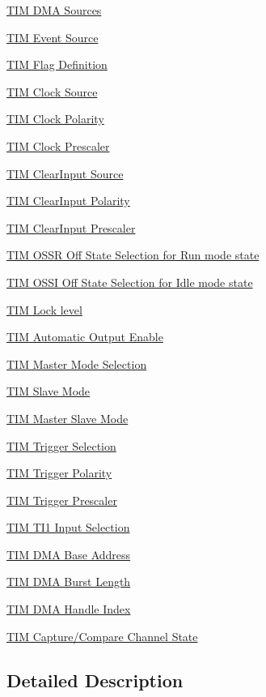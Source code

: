 \begin{DoxyCompactItemize}
\item 
\hyperlink{group___t_i_m___d_m_a__sources}{T\-I\-M D\-M\-A Sources}
\item 
\hyperlink{group___t_i_m___event___source}{T\-I\-M Event Source}
\item 
\hyperlink{group___t_i_m___flag__definition}{T\-I\-M Flag Definition}
\item 
\hyperlink{group___t_i_m___clock___source}{T\-I\-M Clock Source}
\item 
\hyperlink{group___t_i_m___clock___polarity}{T\-I\-M Clock Polarity}
\item 
\hyperlink{group___t_i_m___clock___prescaler}{T\-I\-M Clock Prescaler}
\item 
\hyperlink{group___t_i_m___clear_input___source}{T\-I\-M Clear\-Input Source}
\item 
\hyperlink{group___t_i_m___clear_input___polarity}{T\-I\-M Clear\-Input Polarity}
\item 
\hyperlink{group___t_i_m___clear_input___prescaler}{T\-I\-M Clear\-Input Prescaler}
\item 
\hyperlink{group___t_i_m___o_s_s_r___off___state___selection__for___run__mode__state}{T\-I\-M O\-S\-S\-R Off State Selection for Run mode state}
\item 
\hyperlink{group___t_i_m___o_s_s_i___off___state___selection__for___idle__mode__state}{T\-I\-M O\-S\-S\-I Off State Selection for Idle mode state}
\item 
\hyperlink{group___t_i_m___lock__level}{T\-I\-M Lock level}
\item 
\hyperlink{group___t_i_m___a_o_e___bit___set___reset}{T\-I\-M Automatic Output Enable}
\item 
\hyperlink{group___t_i_m___master___mode___selection}{T\-I\-M Master Mode Selection}
\item 
\hyperlink{group___t_i_m___slave___mode}{T\-I\-M Slave Mode}
\item 
\hyperlink{group___t_i_m___master___slave___mode}{T\-I\-M Master Slave Mode}
\item 
\hyperlink{group___t_i_m___trigger___selection}{T\-I\-M Trigger Selection}
\item 
\hyperlink{group___t_i_m___trigger___polarity}{T\-I\-M Trigger Polarity}
\item 
\hyperlink{group___t_i_m___trigger___prescaler}{T\-I\-M Trigger Prescaler}
\item 
\hyperlink{group___t_i_m___t_i1___selection}{T\-I\-M T\-I1 Input Selection}
\item 
\hyperlink{group___t_i_m___d_m_a___base__address}{T\-I\-M D\-M\-A Base Address}
\item 
\hyperlink{group___t_i_m___d_m_a___burst___length}{T\-I\-M D\-M\-A Burst Length}
\item 
\hyperlink{group___t_i_m___d_m_a___handle__index}{T\-I\-M D\-M\-A Handle Index}
\item 
\hyperlink{group___t_i_m___channel___c_c___state}{T\-I\-M Capture/\-Compare Channel State}
\end{DoxyCompactItemize}


\subsection{Detailed Description}
